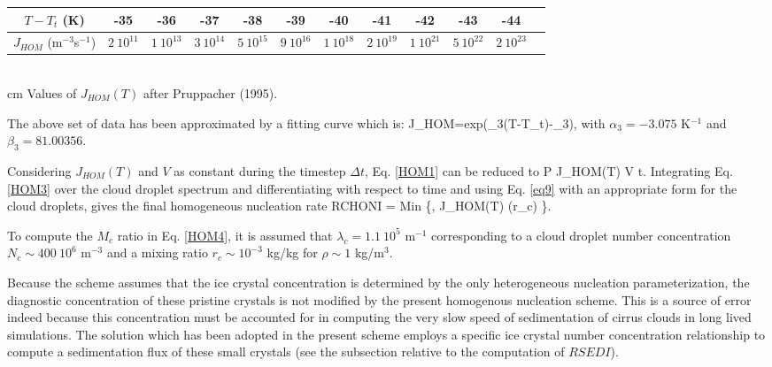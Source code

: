 %
\begin{center}\label{table3prime}
\begin{tabular}{|c|c|c|c|c|c|c|c|c|c|c|c|}
\hline
$T-T_t$ (K)  & -35 & -36 & -37 & -38 & -39 & -40 & -41 & -42 & -43 & -44 \\
\hline
$J_{HOM}$ (m$^{-3}$s$^{-1}$) & $2\ 10^{11}$ & $1\ 10^{13}$ & $3\ 10^{14}$ & $5\
10^{15}$ & $9\ 10^{16}$ & $1\ 10^{18}$ & $2\ 10^{19}$ & $1\ 10^{21}$ & $5\ 10^{2
2}$ & $2\ 10^{23}$ \\
\hline
\end{tabular}
\\
 cm
Values of $J_{HOM}(T)$ after Pruppacher (1995).
\end{center}
%
\noindent The above set of data has been approximated by a fitting curve which
is:
%
\be\label{HOM2}
J_{HOM}=exp(\alpha_3(T-T_t)-\beta_3),
\ee
%
\noindent with $\alpha_3=-3.075$ K$^{-1}$ and $\beta_3=81.00356$.

Considering $J_{HOM}(T)$ and $V$ as constant during the timestep
$\Delta t$, Eq. \ref{HOM1} can be reduced to
%
\be\label{HOM3}
{\cal P} \approx J_{HOM}(T) V \Delta t.
\ee
%
Integrating Eq. \ref{HOM3} over the cloud droplet spectrum and differentiating
with respect to time and using Eq. \ref{eq9} with an appropriate form for the
cloud droplets, gives the final homogeneous nucleation rate
%
\be\label{HOM4}
RCHONI = Min \Big\{,
           \frac{\displaystyle{\pi}}{\displaystyle{6}}
           J_{HOM}(T) (\rho r_c)
           \Big\}.
\ee
%

To compute the $M_c$ ratio in Eq. \ref{HOM4}, it is assumed that
$\lambda_c=1.1\ 10^5$ m$^{-1}$
corresponding to a cloud droplet number concentration $N_c \sim 400\ 10^6$
m$^{-3}$ and a mixing ratio $r_c \sim 10^{-3}$ kg/kg for $\rho \sim 1$ kg/m$^3$.

Because the scheme assumes that the ice crystal concentration is determined by
the only heterogeneous nucleation parameterization, the diagnostic concentration
of these pristine crystals is not modified by the present homogenous nucleation
scheme. This is a source of error indeed because this concentration must be
accounted for in computing the very slow speed of sedimentation of cirrus clouds
in long lived simulations. The solution which has been adopted in the present
scheme employs a specific ice crystal number concentration relationship to
compute a sedimentation flux of these small crystals (see the subsection
relative to the computation of $RSEDI$).

